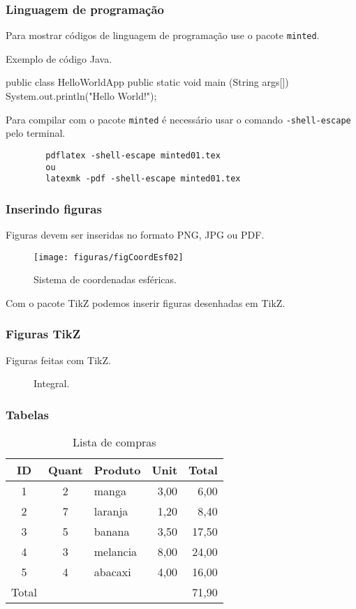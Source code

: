\begin{frame}[fragile]\frametitle{Linguagem de programa\c c\~ao}
	Para mostrar c\'odigos de linguagem de programa\c c\~ao use o pacote \verb|minted|.
	
	Exemplo de c\'odigo Java.
	
	\begin{javacode}
		public class HelloWorldApp {
			public static void main (String args[])
			{
				System.out.println("Hello World!");
			}
		}
	\end{javacode}
	
	Para compilar com o pacote \verb|minted| \'e necess\'ario usar o comando \verb|-shell-escape| pelo terminal.
	
	\begin{verbatim}
		pdflatex -shell-escape minted01.tex
		ou
		latexmk -pdf -shell-escape minted01.tex
	\end{verbatim}
\end{frame}

\begin{frame}\frametitle{Inserindo figuras}
	Figuras devem ser inseridas no formato PNG, JPG ou PDF.
	
	\begin{figure}[h]
		\centering
		\texttt{[image: figuras/figCoordEsf02]}
		\caption{Sistema de coordenadas esf\'ericas.}\label{figCoordEsf02}
	\end{figure}
\end{frame}
Com o pacote TikZ podemos inserir figuras desenhadas em TikZ.
\begin{frame}\frametitle{Figuras TikZ}
	Figuras feitas com TikZ.
	
	\begin{figure}[h]
		\centering
		
		\caption{Integral.}\label{figintegral}
	\end{figure}
\end{frame}

\begin{frame}\frametitle{Tabelas}
	\begin{table}
		\centering
		\begin{tabular}{cclrr}
			\toprule
			ID & Quant & Produto & Unit & Total\\
			\midrule
			1 & 2 & manga     & 3,00 & 6,00\\
			2 & 7 & laranja   & 1,20 & 8,40\\
			3 & 5 & banana    & 3,50 & 17,50\\
			4 & 3 & melancia  & 8,00 & 24,00\\
			5 & 4 & abacaxi   & 4,00 & 16,00\\
			\midrule
			Total &   &      &      & 71,90\\
			\bottomrule
		\end{tabular}
		\caption{Lista de compras}
	\end{table}
\end{frame}

